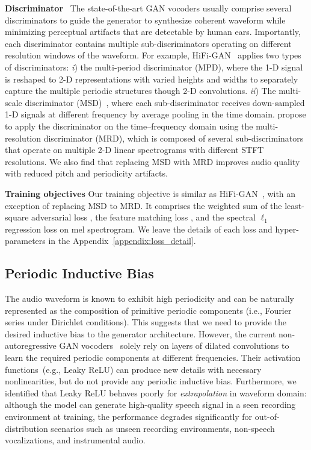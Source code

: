 \documentclass{article} \usepackage{iclr2023_conference,times}
\theoremstyle{plain}
\theoremstyle{definition}
\theoremstyle{remark}
\begin{document}
\textbf{Discriminator}~
The state-of-the-art GAN vocoders usually comprise several discriminators to guide the generator to synthesize coherent waveform while minimizing perceptual artifacts that are detectable by human ears. 
Importantly, each discriminator contains multiple sub-discriminators operating on different resolution windows of the waveform. 
For example, HiFi-GAN~\citep{kong2020hifi} applies two types of discriminators: 
\emph{i}) the multi-period discriminator (MPD), where the 1-D signal is reshaped to 2-D representations with varied heights and widths to separately capture the multiple periodic structures though 2-D convolutions. 
\emph{ii}) The multi-scale discriminator (MSD)~\citep{kumar2019melgan}, where each sub-discriminator receives down-sampled 1-D signals at different frequency by average pooling in the time domain.
\citet{jang2020universal, jang2021univnet} propose to apply the discriminator on the time–frequency domain using the multi-resolution discriminator (MRD), which is composed of several sub-discriminators that operate on multiple 2-D linear spectrograms with different STFT resolutions. 
We also find that replacing MSD with MRD  improves audio quality with reduced pitch and periodicity artifacts.


\textbf{Training objectives} 
Our training objective is similar as HiFi-GAN~\citep{kong2020hifi}, with an exception of replacing MSD to MRD.
It comprises the weighted sum of the least-square adversarial loss \citep{mao2017least}, the feature matching loss \citep{larsen2016autoencoding}, and the spectral $\ell_1$ regression loss on mel spectrogram. We leave the details of each loss and hyper-parameters in the Appendix~\ref{appendix:loss_detail}.



\vspace{-.2cm}
\subsection{Periodic Inductive Bias}
\vspace{-.2cm}
The audio waveform is known to exhibit high periodicity and can be naturally represented as the composition of primitive periodic components {(i.e., Fourier series under Dirichlet conditions)}. This suggests that we need to provide the desired inductive bias to the generator architecture. 
However, the current non-autoregressive GAN vocoders~\citep[e.g.,][]{kong2020hifi} solely rely on layers of dilated convolutions to learn the required periodic components at different frequencies. Their activation functions~(e.g., {Leaky ReLU}) can produce new details with necessary nonlinearities, but do not provide any periodic inductive bias.
Furthermore, we identified that Leaky ReLU behaves poorly for \textit{extrapolation} in waveform domain: although the model can generate high-quality speech signal in a seen recording environment at training, the performance degrades significantly for out-of-distribution scenarios such as unseen recording environments, non-speech vocalizations, and instrumental audio.
\end{document}
